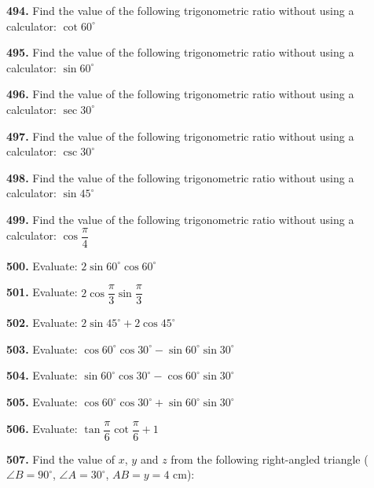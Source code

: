 \documentclass[11pt]{article}
\begin{document}
\bigskip
\noindent\textbf{494.} Find the value of the following trigonometric ratio without using a calculator: $\cot 60^{\circ}$

\bigskip
\noindent\textbf{495.} Find the value of the following trigonometric ratio without using a calculator: $\sin 60^{\circ}$

\bigskip
\noindent\textbf{496.} Find the value of the following trigonometric ratio without using a calculator: $\sec 30^{\circ}$

\bigskip
\noindent\textbf{497.} Find the value of the following trigonometric ratio without using a calculator: $\csc 30^{\circ}$

\bigskip
\noindent\textbf{498.} Find the value of the following trigonometric ratio without using a calculator: $\sin 45^{\circ}$

\bigskip
\noindent\textbf{499.} Find the value of the following trigonometric ratio without using a calculator: $\cos\dfrac{\pi}{4}$

\bigskip
\noindent\textbf{500.} Evaluate: $2\sin 60^{\circ}\cos 60^{\circ}$

\bigskip
\noindent\textbf{501.} Evaluate: $2\cos\dfrac{\pi}{3}\sin\dfrac{\pi}{3}$

\bigskip
\noindent\textbf{502.} Evaluate: $2\sin 45^{\circ}+2\cos 45^{\circ}$

\bigskip
\noindent\textbf{503.} Evaluate: $\cos 60^{\circ}\cos 30^{\circ} - \sin 60^{\circ}\sin 30^{\circ}$

\bigskip
\noindent\textbf{504.} Evaluate: $\sin 60^{\circ}\cos 30^{\circ} - \cos 60^{\circ}\sin 30^{\circ}$

\bigskip
\noindent\textbf{505.} Evaluate: $\cos 60^{\circ}\cos 30^{\circ} + \sin 60^{\circ}\sin 30^{\circ}$

\bigskip
\noindent\textbf{506.} Evaluate: $\tan\dfrac{\pi}{6}\cot\dfrac{\pi}{6}+1$

\bigskip
\noindent\textbf{507.} Find the value of $x$, $y$ and $z$ from the following right-angled triangle ($\angle B = 90^{\circ}$, $\angle A = 30^{\circ}$, $AB=y=4$ cm):
\begin{center}
\end{center}
\end{document}
